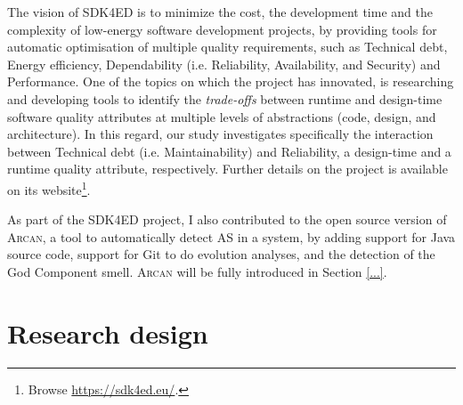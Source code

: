The vision of SDK4ED is to minimize the cost, the development time and the complexity of low-energy software development projects, by providing tools for automatic optimisation of multiple quality requirements, such as Technical debt, Energy efficiency, Dependability (i.e. Reliability, Availability, and Security) and Performance. 
One of the topics on which the project has innovated, is researching and developing tools to identify the \textit{trade-offs} between runtime and design-time software quality attributes at multiple levels of abstractions (code, design, and architecture).
In this regard, our study investigates specifically the interaction between Technical debt (i.e. Maintainability) and Reliability, a design-time and a runtime quality attribute, respectively. Further details on the project is available on its website\footnote{Browse \url{https://sdk4ed.eu/}.}.

As part of the SDK4ED project, I also contributed to the open source version of \textsc{Arcan}, a tool to automatically detect AS in a system, by adding support for Java source code, support for Git to do evolution analyses, and the detection of the God Component smell.
\textsc{Arcan} will be fully introduced in Section \ref{...}.

\section{Research design}\label{sec:intro:research-design}
